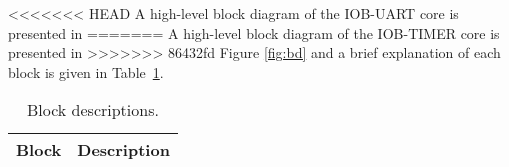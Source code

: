 
<<<<<<< HEAD
A high-level block diagram of the IOB-UART core is presented in
=======
A high-level block diagram of the IOB-TIMER core is presented in
>>>>>>> 86432fd
Figure \ref{fig:bd} and a brief explanation of each block is given in
Table~\ref{tab:blocks}.



\begin{table}[H]
  \centering
    \begin{tabularx}{\textwidth}{ | c | X | }
    \hline
    \rowcolor{iob-green}
    {\bf Block} & {\bf Description} \\ \hline
    
    

    \end{tabularx}
  \caption{Block descriptions.}
  \label{tab:blocks}
\end{table}
